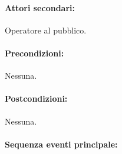 \documentclass{article}
\begin{document}
	\paragraph{Attori secondari:}Operatore al pubblico.
	
	\paragraph{Precondizioni:}Nessuna.
	
	\paragraph{Postcondizioni:}Nessuna.
	
	\paragraph{Sequenza eventi principale:}
\end{document}
